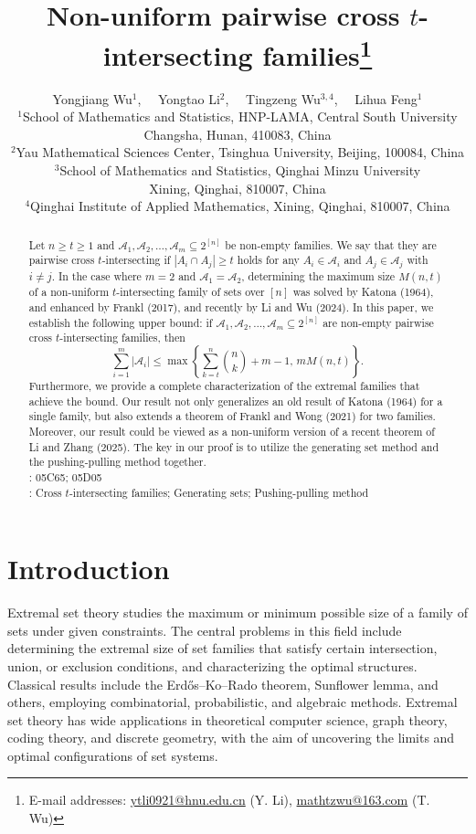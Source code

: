\documentclass[11pt,a4paper]{article}
\title{\bf \Large }
\date{ }
\title{\bf \Large 
Non-uniform pairwise cross $t$-intersecting families\footnote{E-mail addresses: %
\url{ytli0921@hnu.edu.cn} (Y. Li),
\url{mathtzwu@163.com} (T. Wu) 
}}
\author{
{\small  Yongjiang Wu$^1$, \ \ Yongtao Li$^2$,  \ \ Tingzeng Wu$^{3,4}$, \ \ Lihua Feng$^1$}\\[2mm]
\small $^1$School of Mathematics and Statistics, HNP-LAMA, Central South University\\
 \small Changsha, Hunan, 410083, China\\ 
 \small $^2$Yau Mathematical Sciences Center, Tsinghua University, Beijing, 100084, China\\
 \small $^3$School of Mathematics and Statistics, Qinghai Minzu University\\
 \small Xining, Qinghai, 810007, China\\
\small $^4$Qinghai Institute of Applied Mathematics, Xining, Qinghai, 810007, China\\
}
\begin{document}
\maketitle
\begin{abstract}
Let $ n\geq  t\geq  1$ and $ \mathcal{A}_1, \mathcal{A}_2, \ldots, \mathcal{A}_m \subseteq 2^{[n]}$ be non-empty families. We say that they are pairwise cross $t$-intersecting if $|A_i\cap A_j|\geq  t$ holds for any $A_i\in \mathcal{A}_i$ and $A_j\in \mathcal{A}_j$ with $i\neq j$. 
In the case where $m=2$ and $\mathcal{A}_1=\mathcal{A}_2$, 
determining the maximum size $M(n,t)$ of a non-uniform $t$-intersecting family of sets over $[n]$ was solved by Katona (1964), and  enhanced by Frankl (2017), and recently by Li and Wu (2024).  
In this paper, we establish the following upper bound: if  $ \mathcal{A}_1, \mathcal{A}_2, \ldots, \mathcal{A}_m \subseteq 2^{[n]}$ are non-empty pairwise cross $t$-intersecting families, then
$$
\sum_{i=1}^m |\mathcal{A}_i| \leq \max \left\{ \sum_{k=t} ^{n}\binom{n}{k}  + m - 1, \, m M(n, t) \right\}. 
$$
 Furthermore, we provide a complete characterization of  the extremal families that achieve the bound.
Our result not only generalizes an old result of Katona (1964) for a single family, but also extends a theorem of Frankl and Wong (2021) for two families. Moreover, our result could be viewed as a non-uniform version of a recent theorem of Li and Zhang (2025). The key in our proof is to utilize the generating set method and the pushing-pulling method together.  \\



:  05C65; 05D05\\[1mm]
:  Cross $t$-intersecting families; Generating sets; Pushing-pulling method  
\end{abstract}





\section{Introduction}

Extremal set theory studies the maximum or minimum possible size of a family of sets under given constraints. The central problems in this field include determining the extremal size of set families that satisfy certain intersection, union, or exclusion conditions, and characterizing the optimal structures. Classical results include the Erd\H{o}s--Ko--Rado theorem, Sunflower lemma, and others, employing combinatorial, probabilistic, and algebraic methods. Extremal set theory has wide applications in theoretical computer science, graph theory, coding theory, and discrete geometry, with the aim of uncovering the limits and optimal configurations of set systems.  
\end{document}
